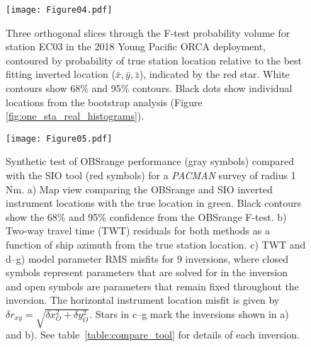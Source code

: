 \begin{figure}[h]
\texttt{[image: Figure04.pdf]}
\caption{ Three orthogonal slices through the F-test probability volume for station EC03 in the 2018 Young Pacific ORCA deployment, contoured by probability of true station location relative to the best fitting inverted location ($\bar{x},\bar{y},\bar{z}$), indicated by the red star. White contours show 68\% and 95\% contours. Black dots show individual locations from the bootstrap analysis (Figure \ref{fig:one_sta_real_histograms}). }
\label{fig:one_sta_real_ftests}
\end{figure}



\begin{figure}[h]
\texttt{[image: Figure05.pdf]}
\caption{ Synthetic test of OBSrange performance (gray symbols) compared with the SIO tool (red symbols) for a \textit{PACMAN} survey of radius 1 Nm. a) Map view comparing the OBSrange and SIO inverted instrument locations with the true location in green. Black contours show the 68\% and 95\% confidence from the OBSrange F-test. b) Two-way travel time (TWT) residuals for both methods as a function of ship azimuth from the true station location. c) TWT and d--g) model parameter RMS misfits for 9 inversions, where closed symbols represent parameters that are solved for in the inversion and open symbols are parameters that remain fixed throughout the inversion. The horizontal instrument location misfit is given by $\delta r_{xy} = \sqrt{\delta x_{O}^2 + \delta y_{O}^2} $. Stars in c--g mark the inversions shown in a) and b). See table~\ref{table:compare_tool} for details of each inversion.}
\label{fig:compare_tool}
\end{figure}

